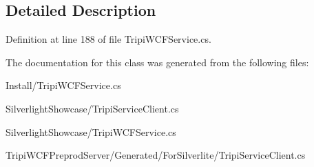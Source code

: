 \subsection{Detailed Description}


Definition at line 188 of file TripiWCFService.cs.

The documentation for this class was generated from the following files:\begin{DoxyCompactItemize}
\item 
Install/TripiWCFService.cs\item 
SilverlightShowcase/TripiServiceClient.cs\item 
SilverlightShowcase/TripiWCFService.cs\item 
TripiWCFPreprodServer/Generated/ForSilverlite/TripiServiceClient.cs\end{DoxyCompactItemize}
